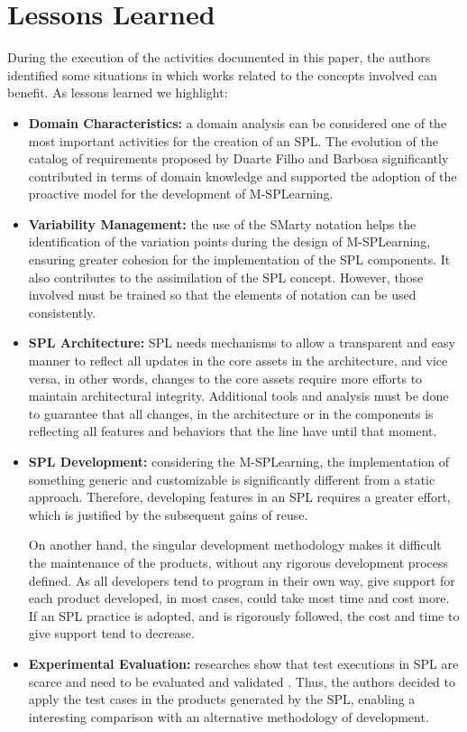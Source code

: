 \section{Lessons Learned}\label{section5}

During the execution of the activities documented in this paper, the authors identified some situations in which works related to the concepts involved can benefit. As lessons learned we highlight:

\begin{itemize}
    \item \textbf{Domain Characteristics:} a domain analysis can be considered one of the most important activities for the creation of an SPL. The evolution of the catalog of requirements proposed by Duarte Filho and Barbosa \cite{filho13} significantly contributed in terms of domain knowledge and supported the adoption of the proactive model for the development of M-SPLear\allowbreak ning.
    \item \textbf{Variability Management:} the use of the SMarty notation helps the identification of the variation points during the design of M-SPLear\allowbreak ning, ensuring greater cohesion for the implementation of the SPL components. It also contributes to the assimilation of the SPL concept. However, those involved must be trained so that the elements of notation can be used consistently.
    \item \textbf{SPL Architecture:} SPL needs mechanisms to allow a transparent and easy manner to reflect all updates in the core assets in the architecture, and vice versa, in other words, changes to the core assets require more efforts to maintain architectural integrity. Additional tools and analysis must be done to guarantee that all changes, in the architecture or in the components is reflecting all features and behaviors that the line have until that moment.
    \item \textbf{SPL Development:} considering the M-SPLear\allowbreak ning, the implementation of something generic and customizable is significantly different from a static approach. Therefore, developing features in an SPL requires a greater effort, which is justified by the subsequent gains of reuse.

On another hand, the singular development methodology makes it difficult the maintenance of the products, without any rigorous development process defined. As all developers tend to program in their own way, give support for each product developed, in most cases, could take most time and cost more. If an SPL practice is adopted, and is rigorously followed, the cost and time to give support tend to decrease.
    \item \textbf{Experimental Evaluation:} researches show that test executions in SPL are scarce and need to be evaluated and validated \cite{engstrom11}. Thus, the authors decided to apply the test cases in the products generated by the SPL, enabling a interesting comparison with an alternative methodology of development.
  

\end{itemize}
